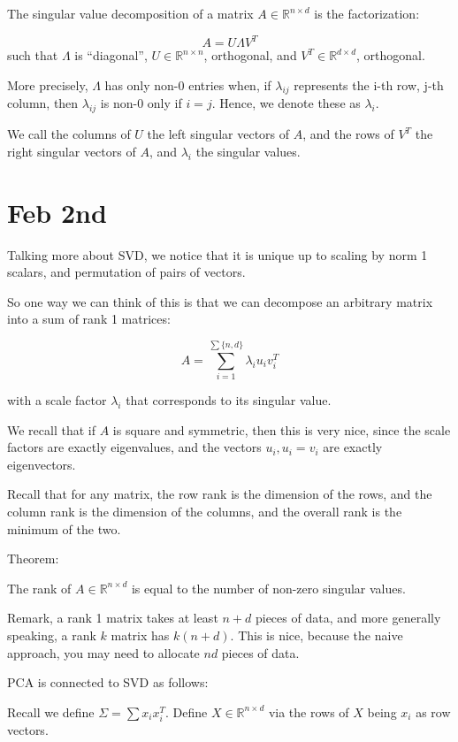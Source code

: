 \documentclass[10pt]{article}
\begin{document}
The singular value decomposition of a matrix $A \in \mathbb{R}^{n \times d}$ is the factorization:

$$ A = U \Lambda V^T$$ such that $\Lambda$ is “diagonal”, $U \in \mathbb{R}^{n \times n}$, orthogonal, and $V^T \in \mathbb{R}^{d \times d}$, orthogonal.

More precisely, $\Lambda$ has only non-0 entries when, if $\lambda_{ij}$ represents the i-th row, j-th column, then $\lambda_{ij}$ is non-0 only if $i = j$. Hence, we denote these as $\lambda_i$.  

We call the columns of $U$ the left singular vectors of $A$, and the rows of $V^T$ the right singular vectors of $A$, and $\lambda_i$ the singular values.

\section*{Feb 2nd}

Talking more about SVD, we notice that it is unique up to scaling by norm 1 scalars, and permutation of pairs of vectors.

So one way we can think of this is that we can decompose an arbitrary matrix into a sum of rank 1 matrices:

$$ A = \sum_{i=1}^{\sum\{ n,d \}} \lambda_i u_i v_i^T$$

with a scale factor $\lambda_i$ that corresponds to its singular value.

We recall that if $A$ is square and symmetric, then this is very nice, since the scale factors are exactly eigenvalues, and the vectors $u_i, u_i = v_i$ are exactly eigenvectors.

Recall that for any matrix, the row rank is the dimension of the rows, and the column rank is the dimension of the columns, and the overall rank is the minimum of the two.

Theorem:

The rank of $A \in \mathbb{R}^{n \times d}$ is equal to the number of non-zero singular values.

Remark, a rank 1 matrix takes at least $n+d$ pieces of data, and more generally speaking, a rank $k$ matrix has $k(n+d)$. This is nice, because the naive approach, you may need to allocate $nd$ pieces of data.

PCA is connected to SVD as follows:

Recall we define $\Sigma = \sum x_i x_i^T$. Define $X \in \mathbb{R}^{n \times d}$ via the rows of $X$ being $x_i$ as row vectors.
\end{document}
